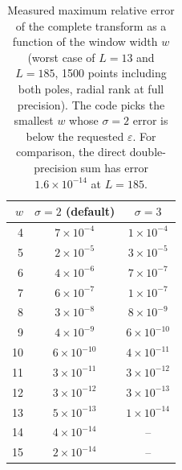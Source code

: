 \begin{table}[!htbp]\centering\small
\caption{Measured maximum relative error of the complete transform as a function of the window width $w$
(worst case of $L=13$ and $L=185$, 1500 points including both poles, radial rank at full precision).
The code picks the smallest $w$ whose $\sigma=2$ error is below the requested $\varepsilon$.
For comparison, the direct double-precision sum has error $1.6\times10^{-14}$ at $L=185$.}\label{tab:calib}
\begin{tabular}{rcc}\toprule
$w$&$\sigma=2$ (default)&$\sigma=3$\\\midrule
4 & $7\times10^{-4}$ & $1\times10^{-4}$\\
5 & $2\times10^{-5}$ & $3\times10^{-5}$\\
6 & $4\times10^{-6}$ & $7\times10^{-7}$\\
7 & $6\times10^{-7}$ & $1\times10^{-7}$\\
8 & $3\times10^{-8}$ & $8\times10^{-9}$\\
9 & $4\times10^{-9}$ & $6\times10^{-10}$\\
10 & $6\times10^{-10}$ & $4\times10^{-11}$\\
11 & $3\times10^{-11}$ & $3\times10^{-12}$\\
12 & $3\times10^{-12}$ & $3\times10^{-13}$\\
13 & $5\times10^{-13}$ & $1\times10^{-14}$\\
14 & $4\times10^{-14}$ & --\\
15 & $2\times10^{-14}$ & --\\
\bottomrule\end{tabular}\end{table}
